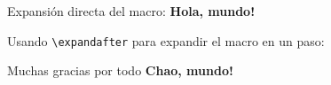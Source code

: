 \documentclass{article}
\newcommand{\saludo}{\textbf{Hola, mundo!}}
\newcommand{\despedida}{\textbf{Chao, mundo!}}
\begin{document}
Expansión directa del macro: \saludo

Usando \texttt{\textbackslash expandafter} para expandir el macro en un paso: \expandafter\saludo

Muchas gracias por todo \despedida
\end{document}
